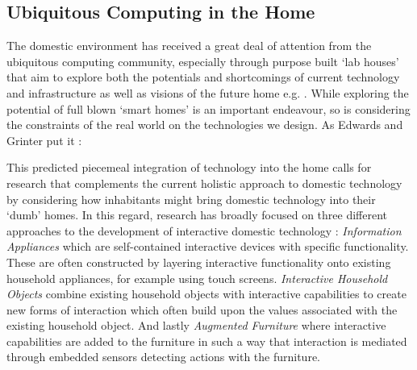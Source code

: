 \subsection{Ubiquitous Computing in the Home}
The domestic environment has received a great deal of attention from the ubiquitous computing community, especially through purpose built ‘lab houses’ that aim to explore both the potentials and shortcomings of current technology and infrastructure as well as visions of the future home e.g. \cite{kidd1999aware}. While exploring the potential of full blown ‘smart homes’ is an important endeavour, so is considering the constraints of the real world on the technologies we design. As Edwards and Grinter put it \cite{edwards2001home}:


This predicted piecemeal integration of technology into the home calls for research that complements the current holistic approach to domestic technology by considering how inhabitants might bring domestic technology into their ‘dumb’ homes. In this regard, research has broadly focused on three different approaches to the development of interactive domestic technology \cite{rodden2003evolution}: \emph{Information Appliances} which are self-contained interactive devices with specific functionality. These are often constructed by layering interactive functionality onto existing household appliances, for example using touch screens. \emph{Interactive Household Objects} combine existing household objects with interactive capabilities to create new forms of interaction which often build upon the values associated with the existing household object. And lastly \emph{Augmented Furniture} where interactive capabilities are added to the furniture in such a way that interaction is mediated through embedded sensors detecting actions with the furniture.

